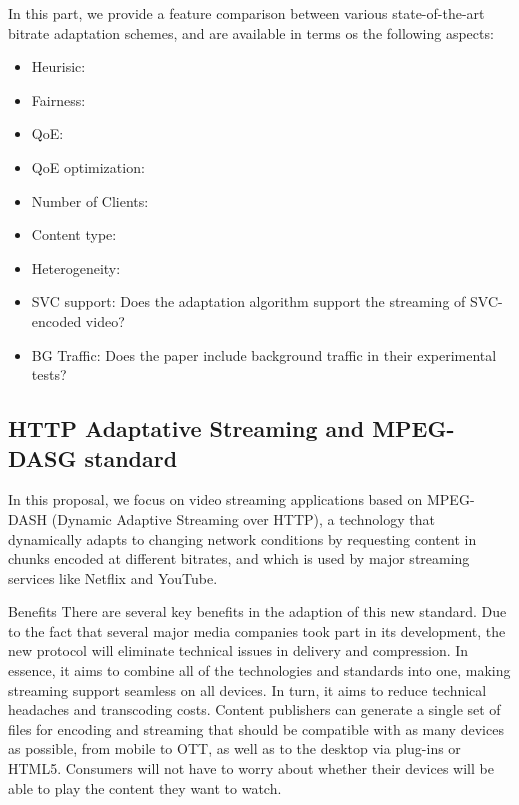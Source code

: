 In this part, we provide a feature comparison between various state-of-the-art bitrate
adaptation schemes, and are available in terms os the following aspects:

\begin{itemize}

\item Heurisic:

\item Fairness:

\item \ac{QoE}:

\item \ac{QoE} optimization:

\item Number of Clients:

\item Content type:

\item Heterogeneity:

\item SVC support: Does the adaptation algorithm support the streaming of SVC-encoded video?

\item BG Traffic: Does the paper include background traffic in their experimental tests?

\end{itemize}


\subsection{HTTP Adaptative Streaming and MPEG-DASG standard}
\label{sec:has-dash}

In this proposal, we focus on video streaming applications based on MPEG-DASH (Dynamic
Adaptive Streaming over HTTP), a technology that dynamically
adapts to changing network conditions by requesting content in
chunks encoded at different bitrates, and which is used by major
streaming services like Netflix and YouTube.

Benefits
There are several key benefits in the adaption of this new standard. Due to the fact that several major media companies took part in its development, the new protocol will eliminate technical issues in delivery and compression. In essence, it aims to combine all of the technologies and standards into one, making streaming support seamless on all devices. In turn, it aims to reduce technical headaches and transcoding costs. Content publishers can generate a single set of files for encoding and streaming that should be compatible with as many devices as possible, from mobile to OTT, as well as to the desktop via plug-ins or HTML5. Consumers will not have to worry about whether their devices will be able to play the content they want to watch.

